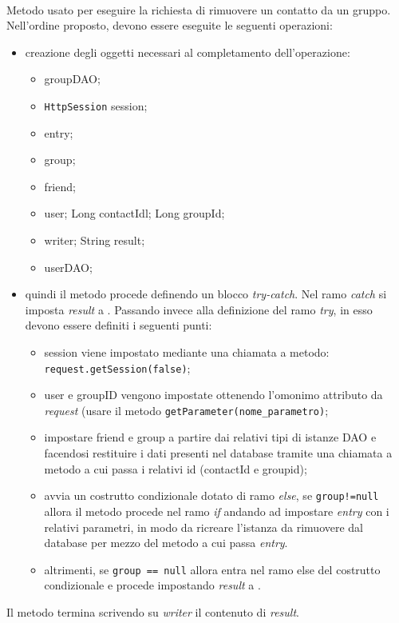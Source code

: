 \begin{description}
	\item{}\\	
	Metodo usato per eseguire la richiesta di rimuovere un contatto da un gruppo. Nell'ordine proposto, devono essere eseguite le seguenti operazioni:
	\begin{itemize}
		\item creazione degli oggetti necessari al completamento dell'operazione:
		\begin{itemize}
			\item {} groupDAO;
			\item \texttt{HttpSession} session;
			\item {} entry;
			\item {} group;
			\item {} friend;
			\item {} user;
			Long contactIdl;
			Long groupId;
			\item {} writer;
			String result;
			\item {} userDAO;
		\end{itemize}
		
		\item quindi il metodo procede definendo un blocco \textit{try-catch}. Nel ramo \textit{catch} si imposta \textit{result} a . Passando invece alla definizione del ramo \textit{try}, in esso devono essere definiti i seguenti punti:
		\begin{itemize}
			\item session viene impostato mediante una chiamata a metodo:
			\verb|request.getSession(false)|;
			\item user e groupID vengono impostate ottenendo l'omonimo attributo da \textit{request} (usare il metodo \texttt{getParameter(nome\_parametro)};
			\item impostare friend e group a partire dai relativi tipi di istanze DAO e facendosi restituire i dati presenti nel database tramite una chiamata a metodo  a cui passa i relativi id (contactId e groupid);
			\item avvia un costrutto condizionale dotato di ramo \textit{else}, se \texttt{group!=null} allora il metodo procede nel ramo \textit{if} andando ad impostare \textit{entry} con i relativi parametri, in modo da ricreare l'istanza  da rimuovere dal database per mezzo del metodo  a cui passa \textit{entry}. 
			\item altrimenti, se \texttt{group == null} allora entra nel ramo else del costrutto condizionale e procede impostando \textit{result} a .
		\end{itemize}
	\end{itemize}
	Il metodo termina scrivendo su \textit{writer} il contenuto di \textit{result}.
	
\end{description}

